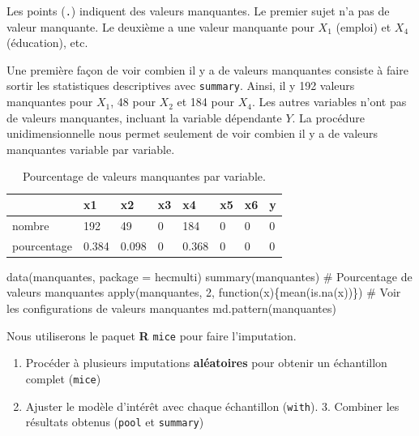 \documentclass[
  11pt,
  letterpaper,
]{scrbook}
\newenvironment{Shaded}{\begin{snugshade}}{\end{snugshade}}
\newcommand{\AttributeTok}[1]{\textcolor[rgb]{0.40,0.45,0.13}{#1}}
\newcommand{\CommentTok}[1]{\textcolor[rgb]{0.37,0.37,0.37}{#1}}
\newcommand{\ControlFlowTok}[1]{\textcolor[rgb]{0.00,0.23,0.31}{#1}}
\newcommand{\DecValTok}[1]{\textcolor[rgb]{0.68,0.00,0.00}{#1}}
\newcommand{\FunctionTok}[1]{\textcolor[rgb]{0.28,0.35,0.67}{#1}}
\newcommand{\NormalTok}[1]{\textcolor[rgb]{0.00,0.23,0.31}{#1}}
\newcommand{\StringTok}[1]{\textcolor[rgb]{0.13,0.47,0.30}{#1}}
\providecommand{\tightlist}{%
  \setlength{\itemsep}{0pt}\setlength{\parskip}{0pt}}\usepackage{longtable,booktabs,array}
\theoremstyle{definition}
\theoremstyle{remark}
\begin{document}
Les points (\texttt{.}) indiquent des valeurs manquantes. Le premier
sujet n'a pas de valeur manquante. Le deuxième a une valeur manquante
pour \(X_1\) (emploi) et \(X_4\) (éducation), etc.

Une première façon de voir combien il y a de valeurs manquantes consiste
à faire sortir les statistiques descriptives avec \texttt{summary}.
Ainsi, il y 192 valeurs manquantes pour \(X_1\), 48 pour \(X_2\) et 184
pour \(X_4\). Les autres variables n'ont pas de valeurs manquantes,
incluant la variable dépendante \(Y\). La procédure unidimensionnelle
nous permet seulement de voir combien il y a de valeurs manquantes
variable par variable.

\hypertarget{tbl-manquantes-univ}{}
\begin{table}
\caption{\label{tbl-manquantes-univ}Pourcentage de valeurs manquantes par variable. }\tabularnewline

\centering
\begin{tabular}{llllllll}
\toprule
  & x1 & x2 & x3 & x4 & x5 & x6 & y\\
\midrule
nombre & 192 & 49 & 0 & 184 & 0 & 0 & 0\\
pourcentage & 0.384 & 0.098 & 0 & 0.368 & 0 & 0 & 0\\
\bottomrule
\end{tabular}
\end{table}

\begin{Shaded}
\begin{Highlighting}[]
\FunctionTok{data}\NormalTok{(manquantes, }\AttributeTok{package =} \StringTok{\textquotesingle{}hecmulti\textquotesingle{}}\NormalTok{)}
\FunctionTok{summary}\NormalTok{(manquantes)}
\CommentTok{\# Pourcentage de valeurs manquantes}
\FunctionTok{apply}\NormalTok{(manquantes, }\DecValTok{2}\NormalTok{, }\ControlFlowTok{function}\NormalTok{(x)\{}\FunctionTok{mean}\NormalTok{(}\FunctionTok{is.na}\NormalTok{(x))\})}
\CommentTok{\# Voir les configurations de valeurs manquantes}
\FunctionTok{md.pattern}\NormalTok{(manquantes)}
\end{Highlighting}
\end{Shaded}

Nous utiliserons le paquet \textbf{R} \texttt{mice} pour faire
l'imputation.

\begin{enumerate}
\def\labelenumi{\arabic{enumi}.}
\tightlist
\item
  Procéder à plusieurs imputations \textbf{aléatoires} pour obtenir un
  échantillon complet (\texttt{mice})
\item
  Ajuster le modèle d'intérêt avec chaque échantillon (\texttt{with}).
  3. Combiner les résultats obtenus (\texttt{pool} et \texttt{summary})
\end{enumerate}
\end{document}

